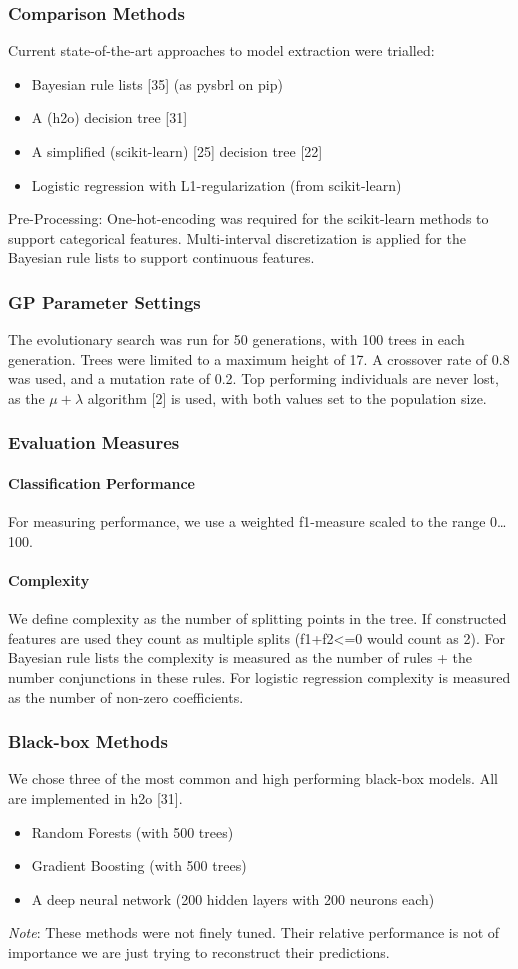 \subsubsection{Comparison Methods}
Current state-of-the-art approaches to model extraction were trialled:
\begin{itemize}
\item Bayesian rule lists [35] (as pysbrl on pip)
\item A (h2o) decision tree [31]
\item A simplified (scikit-learn) [25] decision tree [22]
\item Logistic regression with L1-regularization (from scikit-learn)
\end{itemize}
Pre-Processing: One-hot-encoding was required for the scikit-learn methods to support categorical features. Multi-interval discretization is applied for the Bayesian rule lists to support continuous features.
\subsubsection{GP Parameter Settings}
The evolutionary search was run for 50 generations, with 100 trees in each generation. Trees were limited to a maximum height of 17. A crossover rate of 0.8 was used, and a mutation rate of 0.2. Top performing individuals are never lost, as the $\mu + \lambda$ algorithm [2] is used, with both values set to the population size.
\subsubsection{Evaluation Measures}
\paragraph{Classification Performance}
For measuring performance, we use a weighted f1-measure scaled to the range 0\ldots100.
\paragraph{Complexity}
We define complexity as the number of splitting points in the tree. If constructed features are used they count as multiple splits (f1+f2<=0 would count as 2). For Bayesian rule lists the complexity is measured as the number of rules + the number conjunctions in these rules. For logistic regression complexity is measured as the number of non-zero coefficients.
\subsubsection{Black-box Methods}
We chose three of the most common and high performing black-box models. All are implemented in h2o [31].
\begin{itemize}
\item Random Forests (with 500 trees)
\item Gradient Boosting (with 500 trees)
\item A deep neural network (200 hidden layers with 200 neurons each)
\end{itemize}
\textit{Note}: These methods were not finely tuned. Their relative performance is not of importance we are just trying to reconstruct their predictions.

